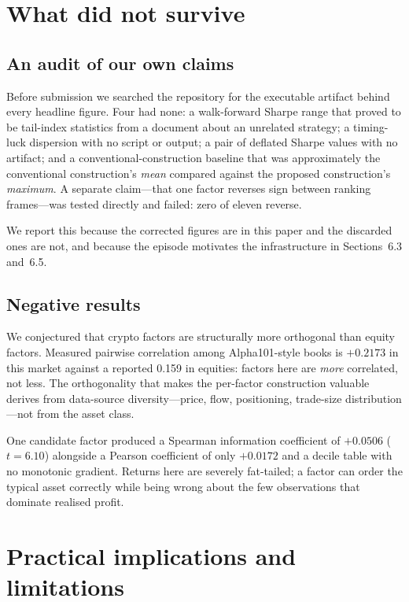 \documentclass[11pt,letterpaper]{article}
\begin{document}
\section{What did not survive}

\subsection{An audit of our own claims}

Before submission we searched the repository for the executable artifact behind
every headline figure. Four had none: a walk-forward Sharpe range that proved to
be tail-index statistics from a document about an unrelated strategy; a
timing-luck dispersion with no script or output; a pair of deflated Sharpe values
with no artifact; and a conventional-construction baseline that was approximately
the conventional construction's \emph{mean} compared against the proposed
construction's \emph{maximum}. A separate claim---that one factor reverses sign
between ranking frames---was tested directly and failed: zero of eleven reverse.

We report this because the corrected figures are in this paper and the discarded
ones are not, and because the episode motivates the infrastructure in
Sections~6.3 and~6.5.

\subsection{Negative results}

We conjectured that crypto factors are structurally more orthogonal than equity
factors. Measured pairwise correlation among Alpha101-style books is $+0.2173$
in this market against a reported 0.159 in equities: factors here are
\emph{more} correlated, not less. The orthogonality that makes the per-factor
construction valuable derives from data-source diversity---price, flow,
positioning, trade-size distribution---not from the asset class.

One candidate factor produced a Spearman information coefficient of $+0.0506$
($t = 6.10$) alongside a Pearson coefficient of only $+0.0172$ and a decile table
with no monotonic gradient. Returns here are severely fat-tailed; a factor can
order the typical asset correctly while being wrong about the few observations
that dominate realised profit.

\section{Practical implications and limitations}
\end{document}
